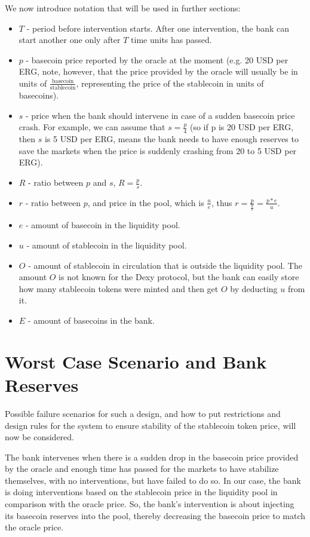 \documentclass[a4paper,UKenglish,cleveref, autoref, thm-restate]{lipics-v2021}
\newcommand{\stc}{stablecoin}
\newcommand{\sct}{stablecoin}
\newcommand{\dx}{Dexy}
\begin{document}
We now introduce notation that will be used in further sections:
\begin{itemize}
  \item{} $T$ - period before intervention starts. After one intervention, the bank can start another one only after $T$ time units has passed. 
  \item{} $p$ - basecoin price reported by the oracle at the moment (e.g. 20 USD per ERG, note, however, that the price provided by the oracle will usually be in units of $\frac{\mathrm{basecoin}}{\mathrm{stablecoin}}$, representing the price of the stablecoin in units of basecoins).
  \item{} $s$ - price when the bank should intervene in case of a sudden basecoin price crash. For example, we can assume that $s = \frac{p}{4}$ (so if p is 20 USD per ERG, then $s$ is 5 USD per ERG, means the bank needs to have enough reserves to save the markets when the price is suddenly crashing from 20 to 5 USD per ERG).
  \item{} $R$ - ratio between $p$ and $s$, $R = \frac{p}{s}$.
  \item{} $r$ - ratio between $p$, and price in the pool, which is $\frac{u}{e}$, thus $r = \frac{p}{\frac{u}{e}} = \frac{p*e}{u}$.
  \item{} $e$ - amount of basecoin in the liquidity pool. 
  \item{} $u$ - amount of \stc{} in the liquidity pool.
  \item{} $O$ - amount of \stc{} in circulation that is outside the liquidity pool. The amount $O$ is not known for the \dx{} protocol, but the bank can easily store how many \sct{} tokens were minted and then get $O$ by deducting $u$ from it.
  \item{} $E$ - amount of basecoins in the bank. 
\end{itemize}  

\section{Worst Case Scenario and Bank Reserves}
\label{sec:worst-case}

Possible failure scenarios for such a design, and how to put restrictions and design rules for the system to ensure stability of the \sct{} token price, will now be considered. 

The bank intervenes when there is a sudden drop in the basecoin price provided by the oracle and enough time has passed for the markets to have stabilize themselves, with no interventions, but have failed to do so. In our case, the bank is doing interventions based on the stablecoin price in the liquidity pool in comparison with the oracle price. So, the bank's intervention is about injecting its basecoin reserves into the pool, thereby decreasing the basecoin price to match the oracle price.  
\end{document}
